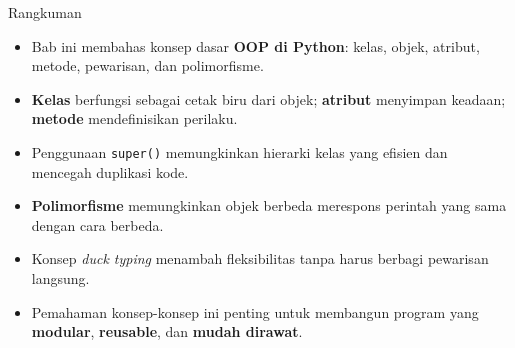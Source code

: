 \documentclass[aspectratio=169, table]{beamer}
\begin{document}
\begin{frame}[fragile]{Rangkuman}
\vspace{20pt}
\begin{itemize}
    \item Bab ini membahas konsep dasar \textbf{OOP di Python}: kelas, objek, atribut, metode, pewarisan, dan polimorfisme.
    \item \textbf{Kelas} berfungsi sebagai cetak biru dari objek; \textbf{atribut} menyimpan keadaan; \textbf{metode} mendefinisikan perilaku.
    \item Penggunaan \texttt{super()} memungkinkan hierarki kelas yang efisien dan mencegah duplikasi kode.
    \item \textbf{Polimorfisme} memungkinkan objek berbeda merespons perintah yang sama dengan cara berbeda.
    \item Konsep \emph{duck typing} menambah fleksibilitas tanpa harus berbagi pewarisan langsung.
    \item Pemahaman konsep-konsep ini penting untuk membangun program yang \textbf{modular}, \textbf{reusable}, dan \textbf{mudah dirawat}.
\end{itemize}
\end{frame}
\end{document}
